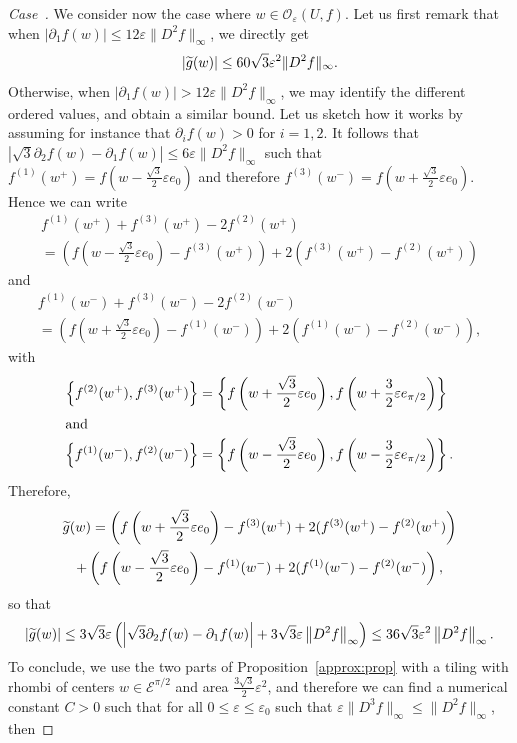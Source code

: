 \documentclass[10pt]{amsart}
\theoremstyle{definition}\newtheorem{defi}[theo]{Definition}\newtheorem{rema}[theo]{Remark}\newtheorem{exam}[theo]{Example}\newtheorem{exem}[theo]{Example}\newtheorem{nota}[theo]{Notation}
\newcommand{\eps}{\varepsilon}
\newcommand{\calE}{\mathcal{E}}
\newcommand{\calO}{\mathcal{O}}
\newcounter{casecount}
\newenvironment{lastcase}{\refstepcounter{casecount}\begin{proof}[Case~\thecasecount]}{\end{proof}}
\let\oldtilde\tilde
\renewcommand*{\tilde}[1]{\mathchoice{\widetilde{#1}}{\widetilde{#1}}{\oldtilde{#1}}{\oldtilde{#1}}}
\begin{document}
\begin{lastcase}
We consider now the case where $w\in {\calO}_\eps (U,f)$. Let us first remark that when $|\partial_1f(w)|\le 12\eps \|D^2f\|_\infty$, we directly get
\[
|\tilde{g}(w)| \le 60\sqrt{3}\eps^2 \|D^2f\|_\infty.
\]
Otherwise, when $|\partial_1f(w)|>12\eps \|D^2f\|_\infty$, we may identify the different ordered values, and obtain a similar bound. Let us sketch how it works by assuming for instance that $\partial_if(w)>0$ for $i=1,2$. It follows that $|\sqrt{3}\partial_2f(w)-\partial_1f(w)|\le 6\eps \|D^2f\|_\infty$ such that $f^{(1)}(w^+)=f(w-\tfrac{\sqrt{3}}{2}\eps e_0)$ and therefore $f^{(3)}(w^-)=f(w+\tfrac{\sqrt{3}}{2}\eps e_0)$. Hence we can write
\begin{multline*}
f^{(1)}(w^+)+f^{(3)}(w^+)-2f^{(2)}(w^+)\\
=\left(f\left(w-\frac{\sqrt{3}}{2}\eps e_0\right)-f^{(3)}(w^+)\right)+2\left(f^{(3)}(w^+)-f^{(2)}(w^+)\right)
\end{multline*}
and
\begin{multline*}
f^{(1)}(w^-)+f^{(3)}(w^-)-2f^{(2)}(w^-)\\
=\left(f\left(w+\frac{\sqrt{3}}{2}\eps e_0\right)-f^{(1)}(w^-)\right)+2\left(f^{(1)}(w^-)-f^{(2)}(w^-)\right),
\end{multline*}
with
\begin{align*}
\left\{f^{(2)}(w^+),f^{(3)}(w^+)\right\}&=\left\{f\left(w+\frac{\sqrt{3}}{2}\eps e_0\right),f\left(w+\frac{3}{2}\eps e_{\pi/2}\right)\right\}\\
\intertext{and}
\left\{f^{(1)}(w^-),f^{(2)}(w^-)\right\}&=\left\{f\left(w-\frac{\sqrt{3}}{2}\eps e_0\right),f\left(w-\frac{3}{2}\eps e_{\pi/2}\right)\right\}.
\end{align*}
Therefore,
\begin{multline*}
\tilde{g}(w) = \left(f\left(w+\frac{\sqrt{3}}{2}\eps e_0\right)-f^{(3)}(w^+)+2(f^{(3)}(w^+)-f^{(2)}(w^+)\right) \\
 + \left(f\left(w-\frac{\sqrt{3}}{2}\eps e_0\right)-f^{(1)}(w^-)+2(f^{(1)}(w^-)-f^{(2)}(w^-)\right),
\end{multline*}
so that
\[
\left|\tilde{g}(w) \right| \le 3\sqrt{3}\eps\left(\left|\sqrt{3}\partial_2f(w)-\partial_1f(w)\right|+3\sqrt{3}\eps \left\|D^2f\right\|_\infty\right)\le 36\sqrt{3}\eps^2 \left\|D^2f\right\|_\infty.
\]
To conclude, we use the two parts of Proposition~\ref{approx:prop} with a tiling with rhombi of centers $w\in {\calE}^{\pi/2}$ and area $\tfrac{3\sqrt{3}}{2}\eps^2$, and therefore we can find a numerical constant $C>0$ such that for all $0\leq \eps\leq\eps_0$ such that $\eps\|D^3f\|_\infty\le \|D^2f\|_\infty$, then

\end{lastcase}
\end{document}
